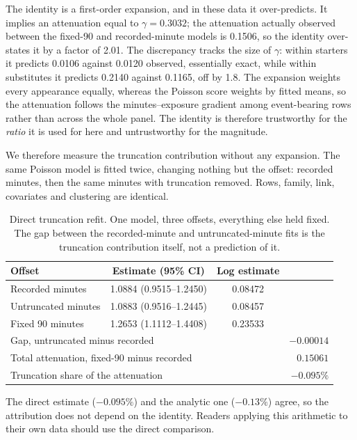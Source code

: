 \documentclass[11pt]{article}
\begin{document}
The identity is a first-order expansion, and in these data it over-predicts. It implies an attenuation equal to $\gamma=0.3032$; the attenuation actually observed between the fixed-90 and recorded-minute models is 0.1506, so the identity over-states it by a factor of 2.01. The discrepancy tracks the size of $\gamma$: within starters it predicts 0.0106 against 0.0120 observed, essentially exact, while within substitutes it predicts 0.2140 against 0.1165, off by 1.8. The expansion weights every appearance equally, whereas the Poisson score weights by fitted means, so the attenuation follows the minutes--exposure gradient among event-bearing rows rather than across the whole panel. The identity is therefore trustworthy for the \emph{ratio} it is used for here and untrustworthy for the magnitude.

We therefore measure the truncation contribution without any expansion. The same Poisson model is fitted twice, changing nothing but the offset: recorded minutes, then the same minutes with truncation removed. Rows, family, link, covariates and clustering are identical.

\begin{table}[h]
\centering
\caption{Direct truncation refit. One model, three offsets, everything else held fixed. The gap between the recorded-minute and untruncated-minute fits is the truncation contribution itself, not a prediction of it.}
\label{tab:supp_direct_refit}
\small
\begin{tabular}{lccr}
\toprule
Offset & Estimate (95\% CI) & Log estimate & \\
\midrule
Recorded minutes & 1.0884 (0.9515--1.2450) & 0.08472 & \\
Untruncated minutes & 1.0883 (0.9516--1.2445) & 0.08457 & \\
Fixed 90 minutes & 1.2653 (1.1112--1.4408) & 0.23533 & \\
\midrule
\multicolumn{3}{l}{Gap, untruncated minus recorded} & $-0.00014$\\
\multicolumn{3}{l}{Total attenuation, fixed-90 minus recorded} & $0.15061$\\
\multicolumn{3}{l}{Truncation share of the attenuation} & $-0.095\%$\\
\bottomrule
\end{tabular}
\end{table}

The direct estimate ($-0.095\%$) and the analytic one ($-0.13\%$) agree, so the attribution does not depend on the identity. Readers applying this arithmetic to their own data should use the direct comparison.
\end{document}

